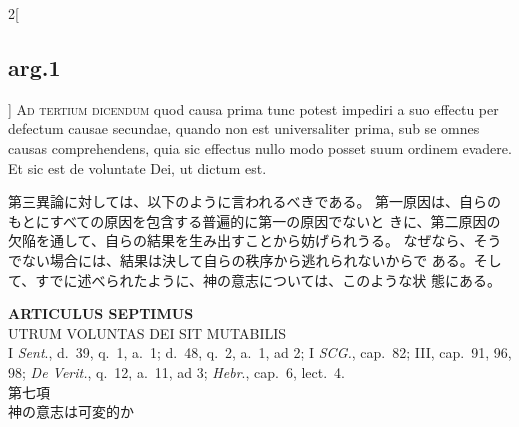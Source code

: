 \documentclass[paper=a4paper,fontsize=10pt,jafontsize=9pt,titlepage]{jlreq}
\begin{document}
\begin{paracol}{2}[\subsection{arg.1}]
{\scshape Ad tertium dicendum} quod causa prima tunc
potest impediri a suo effectu per defectum causae secundae, quando non
est universaliter prima, sub se omnes causas comprehendens, quia sic
effectus nullo modo posset suum ordinem evadere. Et sic est de voluntate
Dei, ut dictum est.

\switchcolumn

第三異論に対しては、以下のように言われるべきである。
第一原因は、自らのもとにすべての原因を包含する普遍的に第一の原因でないと
 きに、第二原因の欠陥を通して、自らの結果を生み出すことから妨げられうる。
 なぜなら、そうでない場合には、結果は決して自らの秩序から逃れられないからで
 ある。そして、すでに述べられたように、神の意志については、このような状
 態にある。

\end{paracol}
\newpage


{}
\setcounter{section}{7}
\setcounter{subsection}{0}
\begin{center}
 {\Large {\bfseries ARTICULUS SEPTIMUS}}\\
 {\large UTRUM VOLUNTAS DEI SIT MUTABILIS}\\
 {\footnotesize I {\itshape Sent}., d.~39, q.~1, a.~1; d.~48, q.~2,
 a.~1, ad 2; I {\itshape SCG.}, cap.~82; III, cap.~91, 96, 98; {\itshape
 De Verit.}, q.~12, a.~11, ad 3; {\itshape Hebr}., cap.~6, lect.~4.}\\
 {\Large 第七項\\神の意志は可変的か}
\end{center}
\end{document}
